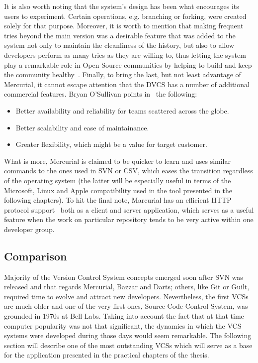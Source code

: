 It is also worth noting that the system's design has been what encourages its users to experiment. Certain operations, e.g. branching or forking, were created solely for that purpose. Moreover, it is worth to mention that making frequent tries beyond the main version was a desirable feature that was added to the system not only to maintain the cleanliness of the history, but also to allow developers perform as many tries as they are willing to, thus letting the system play a remarkable role in Open Source communities by helping to build and keep the community healthy~\cite{git_talk,svn_talk}. Finally, to bring the last, but not least advantage of Mercurial, it cannot escape attention that the DVCS has a number of additional commercial features. Bryan O'Sullivan points in~\cite[page 6]{hg_book} the following: 
\begin{itemize}
\item{Better availability and reliability for teams scattered across the globe.}
\item{Better scalability and ease of maintainance.}
\item{Greater flexibility, which might be a value for target customer.}
\end{itemize}
What is more, Mercurial is claimed to be quicker to learn and uses similar commands to the ones used in SVN or CSV, which eases the transition regardless of the operating system (the latter will be especially useful in terms of the Microsoft, Linux and Apple compatibility used in the tool presented in the following chapters). To hit the final note, Marcurial has an efficient HTTP protocol support~\cite{google_hg_git_compare} both as a client and server application, which serves as a useful feature when the work on particular repository tends to be very active within one developer group.

\subsection{Comparison}\label{subsec:dvcs_compare}
Majority of the Version Control System concepts emerged soon after SVN was released and that regards Mercurial, Bazzar and Darts; others, like Git or Guilt, required time to evolve and attract new developers. Nevertheless, the first VCSs are much older and one of the very first ones, Source Code Control System, was grounded in 1970s at Bell Labs. Taking into account the fact that at that time computer popularity was not that significant, the dynamics in which the VCS systems were developed during those days would seem remarkable. The following section will describe one of the most outstanding VCSs which will serve as a base for the application presented in the practical chapters of the thesis.


